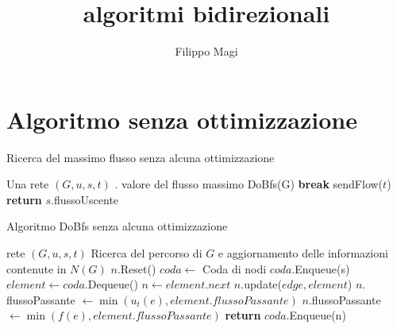 \documentclass{article}
\title{algoritmi bidirezionali}
\author{Filippo Magi }
\begin{document}
\maketitle
\section{Algoritmo senza ottimizzazione}

\begin{algorithm}
    \caption{Ricerca del massimo flusso senza alcuna ottimizzazione}
    \begin{algorithmic}
        \REQUIRE Una rete  $(G,u,s,t)$ .
        \ENSURE valore del flusso massimo
        \STATE DoBfs(G)
        \STATE \textbf{break}
        \ENDIF
        \STATE sendFlow($t$)
        \ENDWHILE
        \STATE \textbf{return} $s.$flussoUscente

    \end{algorithmic}
\end{algorithm}

\begin{algorithm}
    \caption{Algoritmo DoBfs senza alcuna ottimizzazione}
    \begin{algorithmic}
        \REQUIRE rete $(G,u,s,t)$
        \ENSURE Ricerca del percorso di $G$ e aggiornamento delle informazioni contenute in $N(G)$
        \STATE $n$.Reset()
        \ENDFOR
        \STATE $coda \leftarrow$ Coda di nodi
        \STATE $coda$.Enqueue(s)
        \STATE $element \leftarrow coda$.Dequeue()
        \STATE $n \leftarrow element.next$ 
        \STATE {}
        \STATE $n$.update($edge,element$)
        \STATE $n.$flussoPassante $\leftarrow \min(u_t(e),element.flussoPassante)$
        \ELSE
        \STATE $n.$flussoPassante $\leftarrow \min(f(e),element.flussoPassante)$
        \ENDIF
        \STATE \textbf{return}
        \ELSE
        \STATE $coda$.Enqueue(n)
        \ENDIF
        \ENDIF
        \ENDFOR
        \ENDWHILE
    \end{algorithmic}
\end{algorithm}
\end{document}
